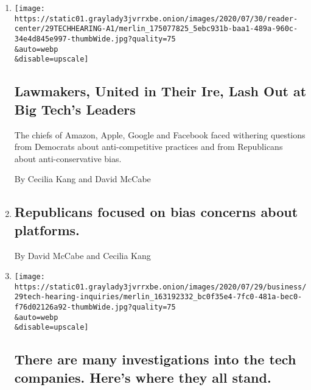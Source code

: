 \begin{enumerate}
\def\labelenumi{\arabic{enumi}.}
\item
  \href{/2020/07/29/technology/big-tech-hearing-apple-amazon-facebook-google.html}{}

  \texttt{[image: https://static01.graylady3jvrrxbe.onion/images/2020/07/30/reader-center/29TECHHEARING-A1/merlin\_175077825\_5ebc931b-baa1-489a-960c-34e4d845e997-thumbWide.jpg?quality=75\\\&auto=webp\\\&disable=upscale]}

  \hypertarget{lawmakers-united-in-their-ire-lash-out-at-big-techs-leaders}{%
  \subsection{Lawmakers, United in Their Ire, Lash Out at Big Tech's
  Leaders}\label{lawmakers-united-in-their-ire-lash-out-at-big-techs-leaders}}

  The chiefs of Amazon, Apple, Google and Facebook faced withering
  questions from Democrats about anti-competitive practices and from
  Republicans about anti-conservative bias.

  By Cecilia Kang and David McCabe
\item
  \href{/live/2020/07/29/technology/tech-ceos-hearing-testimony/republicans-focused-on-bias-concerns-about-platforms}{}

  \hypertarget{republicans-focused-on-bias-concerns-about-platforms}{%
  \subsection{Republicans focused on bias concerns about
  platforms.}\label{republicans-focused-on-bias-concerns-about-platforms}}

  By David McCabe and Cecilia Kang
\item
  \href{/live/2020/07/29/technology/tech-ceos-hearing-testimony/there-are-many-investigations-into-the-tech-companies-heres-where-they-all-stand}{}

  \texttt{[image: https://static01.graylady3jvrrxbe.onion/images/2020/07/29/business/29tech-hearing-inquiries/merlin\_163192332\_bc0f35e4-7fc0-481a-bec0-f76d02126a92-thumbWide.jpg?quality=75\\\&auto=webp\\\&disable=upscale]}

  \hypertarget{there-are-many-investigations-into-the-tech-companies-heres-where-they-all-stand}{%
  \subsection{There are many investigations into the tech companies.
  Here's where they all
  stand.}\label{there-are-many-investigations-into-the-tech-companies-heres-where-they-all-stand}}


\end{enumerate}
